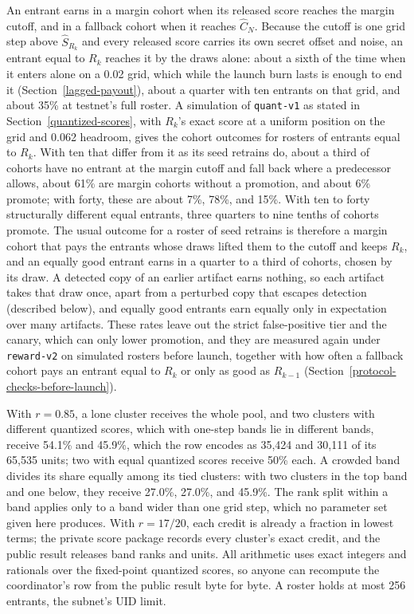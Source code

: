 An entrant earns in a margin cohort when its released score reaches the margin
cutoff, and in a fallback cohort when it reaches \(\hat C_N\). Because the
cutoff is one grid step above \(\hat S_{R_k}\) and every released score carries
its own secret offset and noise, an entrant equal to \(R_k\) reaches it by the
draws alone: about a sixth of the time when it enters alone on a 0.02 grid,
which while the launch burn lasts is enough to end it
(Section~\ref{lagged-payout}), about a quarter with ten entrants on that grid,
and about 35\% at testnet's full roster. A simulation of \texttt{quant-v1} as
stated in Section~\ref{quantized-scores}, with \(R_k\)'s exact score at a
uniform position on the grid and 0.062 headroom, gives the cohort outcomes for
rosters of entrants equal to \(R_k\). With ten that differ from it as its seed
retrains do, about a third of cohorts have no entrant at the margin cutoff and
fall back where a predecessor allows, about 61\% are margin cohorts without a
promotion, and about 6\% promote; with forty, these are about 7\%, 78\%, and
15\%. With ten to forty structurally different equal entrants, three quarters
to nine tenths of cohorts promote. The usual outcome for a roster of seed
retrains is therefore a margin cohort that pays the entrants whose draws lifted
them to the cutoff and keeps \(R_k\), and an equally good entrant earns in a
quarter to a third of cohorts, chosen by its draw. A detected copy of an
earlier artifact earns nothing, so each artifact takes that draw once, apart
from a perturbed copy that escapes detection (described below), and equally
good entrants earn equally only in expectation over many artifacts. These rates
leave out the strict false-positive tier and the canary, which can only lower
promotion, and they are measured again under \texttt{reward-v2} on simulated
rosters before launch, together with how often a fallback cohort pays an
entrant equal to \(R_k\) or only as good as \(R_{k-1}\)
(Section~\ref{protocol-checks-before-launch}).

With \(r=0.85\), a lone cluster receives the whole pool, and two clusters with
different quantized scores, which with one-step bands lie in different bands,
receive 54.1\% and 45.9\%, which the row encodes as 35,424 and 30,111 of its
65,535 units; two with equal quantized scores receive 50\% each. A crowded band
divides its share equally among its tied clusters: with two clusters in the top
band and one below, they receive 27.0\%, 27.0\%, and 45.9\%. The rank split
within a band applies only to a band wider than one grid step, which no
parameter set given here produces. With \(r=17/20\), each credit is already a fraction in
lowest terms; the private score package records every cluster's exact credit,
and the public result releases band ranks and units. All arithmetic uses exact
integers and rationals over the fixed-point quantized scores, so anyone can
recompute the coordinator's row from the public result byte for byte. A roster
holds at most 256 entrants, the subnet's UID limit.

